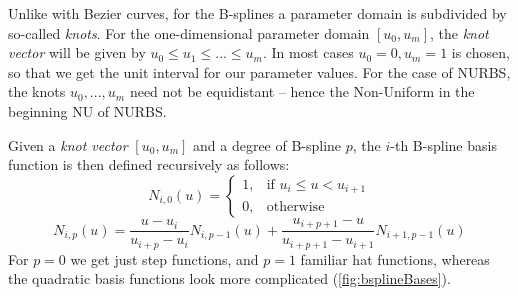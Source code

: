 Unlike with Bezier curves, for the B-splines a parameter domain is subdivided by so-called \textit{knots}. For the one-dimensional parameter domain $[u_{0}, u_{m}]$, the \textit{knot vector} will be given by $u_{0} \leq u_{1} \leq ... \leq u_{m}$. In most cases $u_{0} = 0, u_{m} = 1$ is chosen, so that we get the unit interval for our parameter values. For the case of NURBS, the knots $u_{0},..., u_{m}$ need not be equidistant -- hence the Non-Uniform in the beginning NU of NURBS.

Given a \textit{knot vector} $[u_{0}, u_{m}]$ and a degree of B-spline $p$, the $i$-th B-spline basis function is then defined recursively as follows:
\begin{equation}
N_{i,0}(u) =  \begin{cases} 1, & \mbox{if } u_{i} \leq u < u_{i+1} \\ 0, & \mbox{otherwise } \end{cases}
\end{equation} 
\begin{equation}
N_{i,p}(u) = \frac{u - u_{i}}{u_{i+p} - u_{i}}N_{i, p-1}(u)  + \frac{u_{i+p+1}-u}{u_{i+p+1} - u_{i+1}}N_{i+1, p-1}(u)
\end{equation}
For $p=0$ we get just step functions, and $p=1$ familiar hat functions, whereas the quadratic basis functions look more complicated (\autoref{fig:bsplineBases}).

